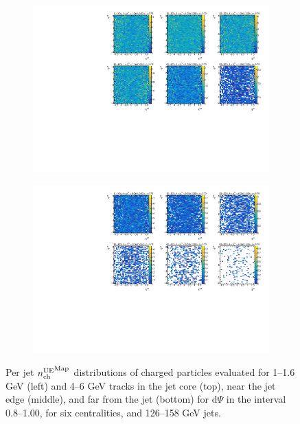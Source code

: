 \begin{figure}
\begin{subfigure}{.5\textwidth}
\centering \includegraphics[width=1\textwidth]{figures/main/UE/eta_phi_map_trk2_dR9}
\caption{}
\end{subfigure}
\begin{subfigure}{.5\textwidth}
\centering \includegraphics[width=1\textwidth]{figures/main/UE/eta_phi_map_trk6_dR9}
\caption{}
\end{subfigure}
\caption{Per jet $\mbox{$n_{\mathrm{ch}}^{\mathrm{UE}}$}^{\mathrm{Map}}$ distributions of charged particles evaluated for 1--1.6 GeV (left) and 4--6 GeV tracks in the jet core (top), near the jet edge (middle), and far from the jet (bottom) for  $\mathrm{d}\Psi$ in the interval 0.8--1.00, for six centralities, and 126--158 GeV jets.}
\label{fig:ue_map}
\end{figure}


